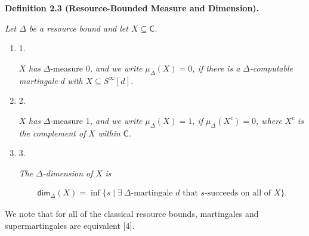 

\par\medskip\noindent\textbf{
\textbf{Definition 2.3}\textbf{ }(Resource-Bounded Measure and Dimension)\textbf{.}
}\par



\emph{Let $\Delta$ be a resource bound and let $X\subseteq\mathsf{C}$.}\par


\begin{enumerate}


\item[] 
1. 


$X$\emph{ has }$\Delta$-measure 0\emph{, and we write }$\mu_{\Delta}(X)=0$\emph{, if there is a }$\Delta$\emph{-computable martingale }$d$\emph{ with }$X\subseteq S^{\infty}[d]$\emph{.}\par





\item[] 
2. 


$X$\emph{ has }$\Delta$-measure 1\emph{, and we write }$\mu_{\Delta}(X)=1$\emph{, if }$\mu_{\Delta}(X^{c})=0$\emph{, where }$X^{c}$\emph{ is the complement of }$X$\emph{ within }$\mathsf{C}$\emph{.}\par





\item[] 
3. 


\emph{The }$\Delta$\emph{-dimension of }$X$\emph{ is}\par


\[\begin{gathered}
{\mathsf{dim}}_{\Delta}(X)=\inf\{s\mid\exists\ \Delta\textrm{-martingale $d$ that $s$-succeeds on all of $X$}\}.
\end{gathered}\]





\end{enumerate}






We note that for all of the classical resource bounds, martingales and supermartingales are equivalent [4].\par




